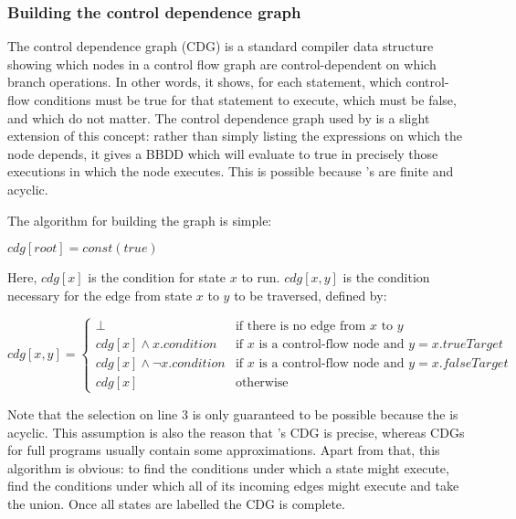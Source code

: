 \subsubsection{Building the control dependence graph}

The control dependence graph (CDG) is a standard compiler data
structure\needCite{} showing which nodes in a control flow graph are
control-dependent on which branch operations.  In other words, it
shows, for each statement, which control-flow conditions must be true
for that statement to execute, which must be false, and which do not
matter.  The control dependence graph used by {\technique} is a slight
extension of this concept: rather than simply listing the expressions
on which the node depends, it gives a BBDD which will evaluate to true
in precisely those executions in which the node executes.  This is
possible because {\technique}'s {\StateMachines} are finite and
acyclic.

The algorithm for building the graph is simple:

\begin{algorithmic}[1]
\State $cdg[root] = const(true)$
\EndWhile
\end{algorithmic}

Here, $cdg[x]$ is the condition for state $x$ to run.  $cdg[x, y]$ is
the condition necessary for the edge from state $x$ to $y$ to be
traversed, defined by:

\begin{displaymath}
cdg[x, y] = \begin{cases}
  \bot                            & \text{if there is no edge from $x$ to $y$} \\
  cdg[x] \wedge x.condition       & \text{if $x$ is a control-flow node and $y = x.trueTarget$} \\
  cdg[x] \wedge {\neg}x.condition & \text{if $x$ is a control-flow node and $y = x.falseTarget$} \\
  cdg[x]                          & \text{otherwise}
\end{cases}
\end{displaymath}

Note that the selection on line 3 is only guaranteed to be possible
because the {\StateMachine} is acyclic.  This assumption is also the reason
that {\technique}'s CDG is precise, whereas CDGs for full programs
usually contain some approximations.  Apart from that, this algorithm
is obvious: to find the conditions under which a state might execute,
find the conditions under which all of its incoming edges might
execute and take the union.  Once all states are labelled the CDG is
complete.

